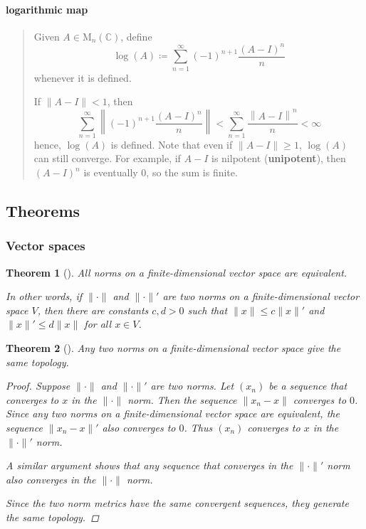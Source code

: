 \documentclass[letterpaper, 10pt]{article}
\theoremstyle{theostyle}
\newtheorem{theorem}{Theorem}[section]
\newenvironment{thmstyle}[1][]{%
    \begin{theorem}[#1]\leavevmode\vspace{-\baselineskip}\myquote%
    }{\endmyquote\end{theorem}}
\begin{document}
\paragraph{logarithmic map}
\begin{quote}
    Given \(A \in \mathrm{M}_n (\mathbb{C})\), define
    \[\log{(A)} \coloneqq \sum_{n=1}^{\infty} (-1)^{n+1} \frac{(A - I)^n}{n}\]
    whenever it is defined.


    If \(\lVert A - I \rVert < 1\), then
    \[\sum_{n=1}^{\infty} \left\lVert (-1)^{n+1} \frac{(A - I)^n}{n} \right\rVert < \sum_{n=1}^{\infty} \frac{\left\lVert A - I \right\rVert^n}{n}  < \infty\]
    hence, \(\log{(A)}\) is defined.
    Note that even if \(\lVert A - I \rVert \geq 1\), \(\log(A)\) can still converge.
    For example, if \(A - I\) is nilpotent (\textbf{unipotent}), then \((A - I)^n\) is eventually \(0\), so the sum is finite.
\end{quote}

\subsection{Theorems}

\subsubsection{Vector spaces}
\begin{thmstyle}
    All norms on a finite-dimensional vector space are equivalent.
    
    
    In other words, if \(\lVert \cdot \rVert\) and \(\lVert \cdot \rVert'\) are two norms on a finite-dimensional vector space \(V\),
    then there are constants \(c, d > 0\) such that \(\lVert x \rVert \leq c \lVert x \rVert'\) and \(\lVert x \rVert' \leq d \lVert x \rVert\) for all \(x \in V\).
\end{thmstyle}

\begin{thmstyle}
    Any two norms on a finite-dimensional vector space give the same topology.
    
    \begin{proof}
        Suppose \(\lVert \cdot \rVert\) and \(\lVert \cdot \rVert'\) are two norms.
        Let \((x_n)\) be a sequence that converges to \(x\) in the \(\lVert \cdot \rVert\) norm.
        Then the sequence \(\lVert x_n - x \rVert\) converges to \(0\).
        Since any two norms on a finite-dimensional vector space are equivalent, the sequence \(\lVert x_n - x \rVert'\) also converges to \(0\).
        Thus \((x_n)\) converges to \(x\) in the \(\lVert \cdot \rVert'\) norm.

        A similar argument shows that any sequence that converges in the \(\lVert \cdot \rVert'\) norm also converges in the \(\lVert \cdot \rVert\) norm.
        
        Since the two norm metrics have the same convergent sequences, they generate the same topology.
    \end{proof}
\end{thmstyle}
\end{document}
